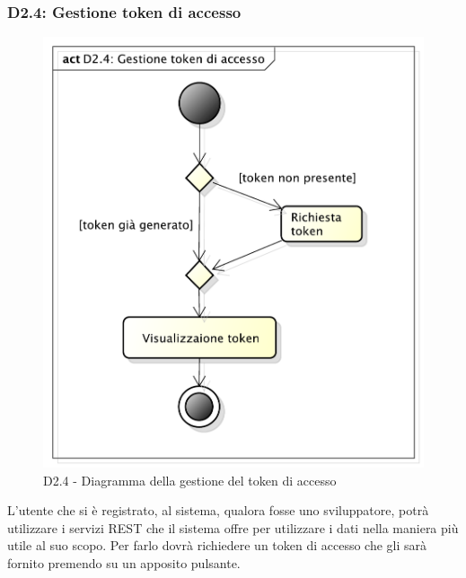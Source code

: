 		\subsubsection{D2.4: Gestione token di accesso} %
		\label{ssub:gestione_token_di_accesso}
		\begin{figure}[!htbp]
			\centering
			\centerline{\includegraphics[scale=0.45]{./images/D2_4.pdf}}
			\caption{D2.4 - Diagramma della gestione del token di accesso}
		\end{figure}
		\noindent
		L'utente che si è registrato, al sistema, qualora fosse uno sviluppatore, potrà utilizzare i servizi REST che il sistema offre per utilizzare i dati nella maniera più utile al suo scopo. Per farlo dovrà richiedere un token di accesso che gli sarà fornito premendo su un apposito pulsante.

